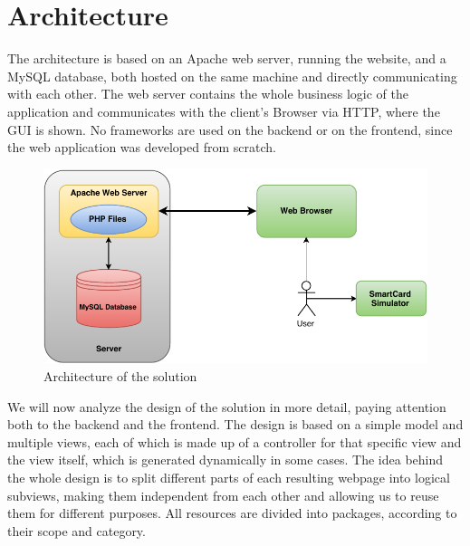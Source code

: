 \section{Architecture}\label{section:architecture}
The architecture is based on an Apache web server, running the \gnb{} website, and a MySQL database, both hosted on the same machine and directly communicating with each other. The web server contains the whole business logic of the application and communicates with the client's Browser via HTTP, where the GUI is shown. No frameworks are used on the backend or on the frontend, since the web application was developed from scratch.\newline
\begin{figure}[h!tbp]
	\centering
	\includegraphics[width=\textwidth]{figures/gnb_architecture}
	\caption{Architecture of the solution}
	\label{figure:architecture}
\end{figure}
We will now analyze the design of the solution in more detail, paying attention both to the backend and the frontend.\newline
The design is based on a simple model and multiple views, each of which is made up of a controller for that specific view and the view itself, which is generated dynamically in some cases.
The idea behind the whole design is to split different parts of each resulting webpage into logical subviews, making them independent from each other and allowing us to reuse them for different purposes.\newline
All resources are divided into packages, according to their scope and category.

